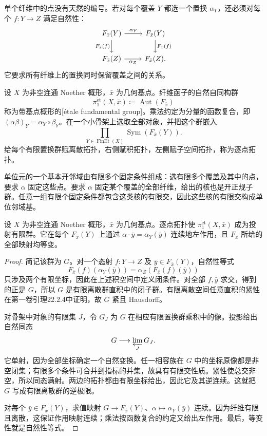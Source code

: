 \ProseParagraphBreak
单个纤维中的点没有天然的编号。若对每个覆盖 \(Y\) 都选一个置换 \(\alpha_Y\)，还必须对每个 \(f:Y\rightarrow Z\) 满足自然性：
\[
	\begin{tikzcd}
		F_{\bar x}(Y)\arrow[r,"\alpha_Y"]\arrow[d,"F_{\bar x}(f)"']
		&F_{\bar x}(Y)\arrow[d,"F_{\bar x}(f)"]\\
		F_{\bar x}(Z)\arrow[r,"\alpha_Z"']&F_{\bar x}(Z).
	\end{tikzcd}
\]
它要求所有纤维上的置换同时保留覆盖之间的关系。

\begin{definition}\label{b3:def:I-etale-fundamental-group}
	设 \(X\) 为非空连通 Noether 概形，\(\bar x\) 为几何基点。纤维函子的自然自同构群
	\[
		\pi_1^{\mathrm{\acute et}}(X,\bar x)
		\coloneqq\operatorname{Aut}(F_{\bar x})
	\]
	称为带基点概形的[étale fundamental group]。乘法约定为分量的函数复合，即 \((\alpha\beta)_Y=\alpha_Y\circ\beta_Y\)。在一个小骨架上选取全部对象，并把这个群嵌入
	\[
		\prod_{Y\in\operatorname{FinEt}(X)}
		\operatorname{Sym}(F_{\bar x}(Y)).
	\]
	给每个有限置换群赋离散拓扑，右侧赋积拓扑，左侧赋子空间拓扑，称为逐点拓扑。
\end{definition}

单位元的一个基本开邻域由有限多个固定条件组成：选有限多个覆盖及其中的点，要求 \(\alpha\) 固定这些点。要求 \(\alpha\) 固定某个覆盖的全部纤维，给出的核也是开正规子群。任意一组有限个固定条件都包含这类核的有限交，因此这些核的有限交构成单位邻域基。

\begin{proposition}\label{b3:prop:I-fundamental-group-profinite}
	设 \(X\) 为非空连通 Noether 概形，\(\bar x\) 为几何基点。逐点拓扑使 \(\pi_1^{\mathrm{\acute et}}(X,\bar x)\) 成为投射有限群。它在每个 \(F_{\bar x}(Y)\) 上通过 \(\alpha\cdot\bar y=\alpha_Y(\bar y)\) 连续地左作用，且 \(F_{\bar x}\) 所给的全部映射均等变。
\end{proposition}
\begin{proof}
	简记该群为 \(G\)。对一个态射 \(f:Y\rightarrow Z\) 及 \(\bar y\in F_{\bar x}(Y)\)，自然性等式
	\[
		F_{\bar x}(f)(\alpha_Y(\bar y))
		=\alpha_Z(F_{\bar x}(f)(\bar y))
	\]
	只涉及两个有限坐标，因此在上述积空间中定义闭条件。对全部 \(f,\bar y\) 求交，得到的正是 \(G\)，所以 \(G\) 是有限离散群直积中的闭子群。有限离散空间任意直积的紧性在第一卷引理22.2.4中证明，故 \(G\) 紧且 Hausdorff。

	对骨架中对象的有限集 \(J\)，令 \(G_J\) 为 \(G\) 在相应有限置换群乘积中的像。投影给出自然同态
	\[
		G\longrightarrow\varprojlim_JG_J.
	\]
	它单射，因为全部坐标确定一个自然变换。任一相容族在 \(G\) 中的坐标原像都是非空闭集；有限多个条件可合并到指标的并集，故具有有限交性质。紧性使总交非空，所以同态满射。两边的拓扑都由有限坐标给出，因此它及其逆连续。这就把 \(G\) 写成有限离散群的逆极限。

	对每个 \(\bar y\in F_{\bar x}(Y)\)，求值映射 \(G\rightarrow F_{\bar x}(Y)\)、\(\alpha\mapsto\alpha_Y(\bar y)\) 连续。因为纤维有限且离散，这保证作用映射连续；乘法按函数复合的约定又给出左作用。最后，等变性就是自然性等式。
\end{proof}

